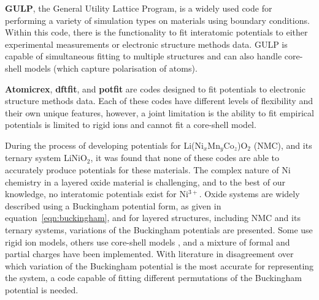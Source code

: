 \documentclass[../main.tex]{subfiles}
\begin{document}
\textbf{GULP},\cite{GULP} the General Utility Lattice Program, is a widely used code for performing a variety of simulation types on materials using boundary conditions. \cite{gale_gulp_1997} Within this code, there is the functionality to fit interatomic potentials to either experimental measurements or electronic structure methods data.\cite{gale_empirical_1996} GULP is capable of simultaneous fitting to multiple structures and can also handle core-shell models (which capture polarisation of atoms).

\textbf{Atomicrex},\cite{Stukowski_2017} \textbf{dftfit},\cite{dftfit} and \textbf{potfit}\cite{wen_kim-compliant_2017,potfit} are codes designed to fit potentials to electronic structure methods data. Each of these codes have different levels of flexibility and their own unique features, however, a joint limitation is the ability to fit empirical potentials is limited to rigid ions and cannot fit a core-shell model.

During the process of developing potentials for Li(Ni$_x$Mn$_y$Co$_z$)O$_2$ (NMC), and its ternary system LiNiO$_2$, it was found that none of these codes are able to accurately produce potentials for these materials. The complex nature of Ni chemistry in a layered oxide material is challenging, and to the best of our knowledge, no interatomic potentials exist for Ni$^{3+}$. Oxide systems are widely described using a Buckingham potential form, as given in equation~\ref{eqn:buckingham}, and for layered structures, including NMC and its ternary systems, variations of the Buckingham potentials are presented. Some use rigid ion models,\cite{Lewis_1985, Ledwaba2020, Sayle2005, Dawson0214} others use core-shell models \cite{Hart1998, Fisher2010, Lewis_1985,Ammundsen1999, Kerisit2014, he2019thermal,lee2012atomistic}, and a mixture of formal and partial charges have been implemented. With literature in disagreement over which variation of the Buckingham potential is the most accurate for representing the system, a code capable of fitting different permutations of the Buckingham potential is needed.
\end{document}
